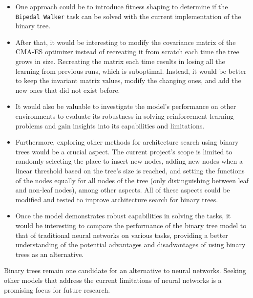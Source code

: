 \begin{itemize}

\item One approach could be to introduce fitness shaping to determine if the \texttt{Bipedal Walker} task can be solved with the current implementation of the binary tree.

\item After that, it would be interesting to modify the covariance matrix of the CMA-ES optimizer instead of recreating it from scratch each time the tree grows in size. Recreating the matrix each time results in losing all the learning from previous runs, which is suboptimal. Instead, it would be better to keep the invariant matrix values, modify the changing ones, and add the new ones that did not exist before.

\item It would also be valuable to investigate the model's performance on other environments to evaluate its robustness in solving reinforcement learning problems and gain insights into its capabilities and limitations.

\item Furthermore, exploring other methods for architecture search using binary trees would be a crucial aspect. The current project's scope is limited to randomly selecting the place to insert new nodes, adding new nodes when a linear threshold based on the tree's size is reached, and setting the functions of the nodes equally for all nodes of the tree (only distinguishing between leaf and non-leaf nodes), among other aspects. All of these aspects could be modified and tested to improve architecture search for binary trees.

\item Once the model demonstrates robust capabilities in solving the tasks, it would be interesting to compare the performance of the binary tree model to that of traditional neural networks on various tasks, providing a better understanding of the potential advantages and disadvantages of using binary trees as an alternative.

\end{itemize}

Binary trees remain one candidate for an alternative to neural networks. Seeking other models that address the current limitations of neural networks is a promising focus for future research.
